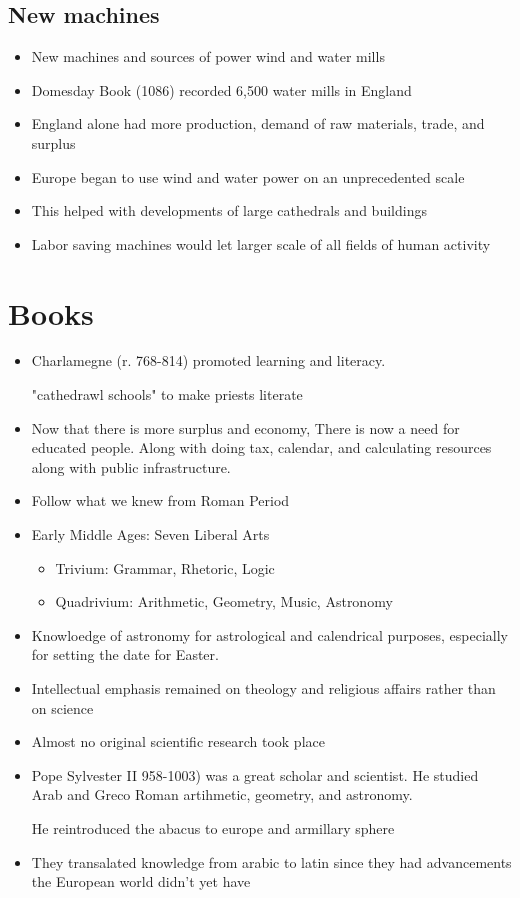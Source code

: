 \documentclass{article}
\begin{document}
\subsection{New machines}
\begin{itemize}
  \item New machines and sources of power
    \rightarrow{} wind and water mills
  \item Domesday Book (1086) recorded 6,500 water mills in England
  \item England alone had more production, demand of raw materials,
    trade, and surplus
  \item Europe began to use wind and water power on an unprecedented scale
  \item This helped with developments
    of large cathedrals and buildings
  \item Labor saving machines would let larger scale of all fields of human activity
\end{itemize}

\section{Books}
\begin{itemize}
  \item Charlamegne (r. 768-814) promoted learning and literacy.

    "cathedrawl schools" to make priests literate
  \item Now that there is more surplus and economy, There is now a need for
    educated people. Along with doing tax, calendar, and calculating
    resources along with public infrastructure.
  \item Follow what we knew from Roman Period
  \item Early Middle Ages: Seven Liberal Arts
    \begin{itemize}
      \item Trivium: Grammar, Rhetoric, Logic
      \item Quadrivium: Arithmetic, Geometry, Music, Astronomy
    \end{itemize}
  \item Knowloedge of astronomy for astrological and calendrical purposes,
    especially for setting the date for Easter.
  \item Intellectual emphasis remained on theology and religious affairs rather than on science
  \item Almost no original scientific research took place
  \item Pope Sylvester II 958-1003) was a great scholar and scientist.
    He studied Arab and Greco Roman artihmetic, geometry, and astronomy.

    He reintroduced the abacus to europe and armillary sphere
  \item They transalated knowledge from arabic to latin since they had advancements
    the European world didn't yet have
\end{itemize}
\end{document}
